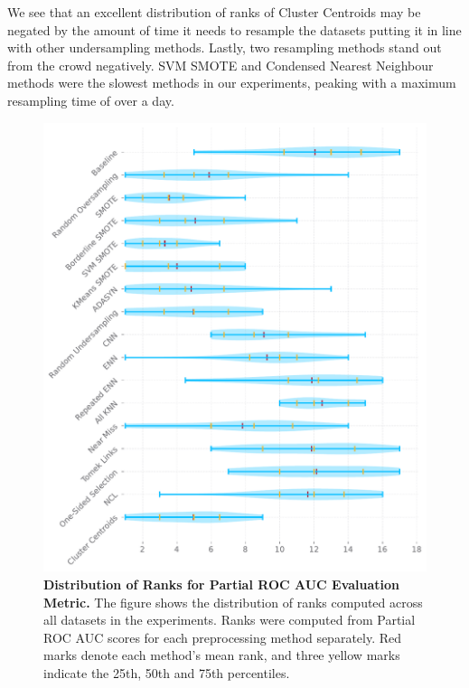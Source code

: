 We see that an excellent distribution of ranks of Cluster Centroids may be negated by the amount of
time it needs to resample the datasets putting it in line with other undersampling methods. Lastly,
two resampling methods stand out from the crowd negatively. SVM SMOTE and Condensed Nearest
Neighbour methods were the slowest methods in our experiments, peaking with a maximum resampling
time of over a day.



\begin{figure}
    \centering
    \includegraphics[width=\linewidth]{figures/partial_roc_auc_ranks_distribution.pdf}
    \caption{
        \textbf{Distribution of Ranks for Partial ROC AUC Evaluation Metric.} The figure shows the
        distribution of ranks computed across all datasets in the experiments. Ranks were computed
        from Partial ROC AUC scores for each preprocessing method separately. Red marks denote each
        method’s mean rank, and three yellow marks indicate the 25th, 50th and 75th percentiles.
    }
    \label{figure:p-roc-ranks}
\end{figure}

